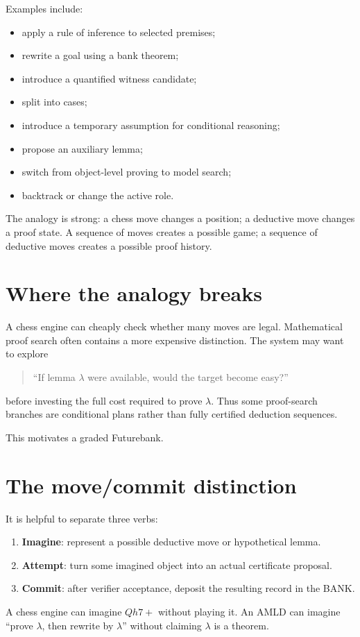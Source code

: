 \documentclass[11pt,openany]{book}
\theoremstyle{definition}
\theoremstyle{remark}
\begin{document}
Examples include:
\begin{itemize}
\item apply a rule of inference to selected premises;
\item rewrite a goal using a bank theorem;
\item introduce a quantified witness candidate;
\item split into cases;
\item introduce a temporary assumption for conditional reasoning;
\item propose an auxiliary lemma;
\item switch from object-level proving to model search;
\item backtrack or change the active role.
\end{itemize}

The analogy is strong: a chess move changes a position; a deductive move changes a proof state. A sequence of moves creates a possible game; a sequence of deductive moves creates a possible proof history.

\section{Where the analogy breaks}
A chess engine can cheaply check whether many moves are legal. Mathematical proof search often contains a more expensive distinction. The system may want to explore
\begin{quote}
``If lemma $\lambda$ were available, would the target become easy?''
\end{quote}
before investing the full cost required to prove $\lambda$. Thus some proof-search branches are conditional plans rather than fully certified deduction sequences.

This motivates a graded Futurebank.

\section{The move/commit distinction}
It is helpful to separate three verbs:
\begin{enumerate}
\item \textbf{Imagine}: represent a possible deductive move or hypothetical lemma.
\item \textbf{Attempt}: turn some imagined object into an actual certificate proposal.
\item \textbf{Commit}: after verifier acceptance, deposit the resulting record in the BANK.
\end{enumerate}
A chess engine can imagine $Qh7+$ without playing it. An AMLD can imagine ``prove $\lambda$, then rewrite by $\lambda$'' without claiming $\lambda$ is a theorem.
\end{document}
